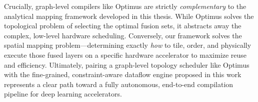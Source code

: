 Crucially, graph-level compilers like Optimus are strictly \emph{complementary} to the analytical mapping framework developed in this thesis. While Optimus solves the topological problem of selecting the optimal fusion sets, it abstracts away the complex, low-level hardware scheduling. Conversely, our framework solves the spatial mapping problem—determining exactly \emph{how} to tile, order, and physically execute those fused layers on a specific hardware accelerator to maximize reuse and efficiency. Ultimately, pairing a graph-level topology scheduler like Optimus with the fine-grained, constraint-aware dataflow engine proposed in this work represents a clear path toward a fully autonomous, end-to-end compilation pipeline for deep learning accelerators.